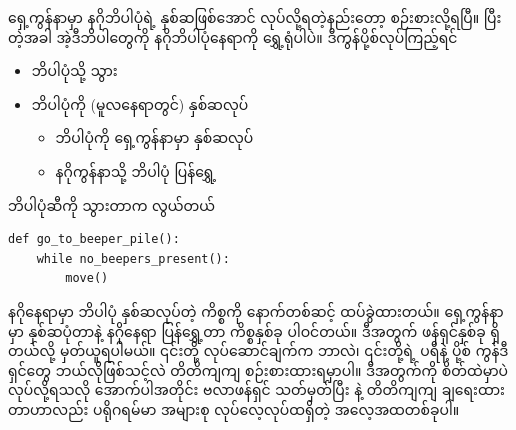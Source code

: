 ရှေ့ကွန်နာမှာ နဂိုဘိပါပုံရဲ့ နှစ်ဆဖြစ်အောင် လုပ်လို့ရတဲ့နည်းတော့ စဉ်းစားလို့ရပြီ။ ပြီးတဲ့အခါ အဲ့ဒီဘိပါတွေကို နဂိုဘိပါပုံနေရာကို ရွှေ့ရုံပါပဲ။ ဒီကွန်ပို့စ်လုပ်ကြည့်ရင် 
%
\begin{itemize}
    \item ဘိပါပုံသို့ သွား       
    \item ဘိပါပုံကို (မူလနေရာတွင်) နှစ်ဆလုပ်    
    \begin{itemize}
        \item ဘိပါပုံကို ရှေ့ကွန်နာမှာ နှစ်ဆလုပ်
        \item နဂိုကွန်နာသို့ ဘိပါပုံ ပြန်ရွှေ့
    \end{itemize}
\end{itemize}
%
ဘိပါပုံဆီကို သွားတာက လွယ်တယ်
%
\setlength{\fboxsep}{0pt}
\begin{verbatim}
def go_to_beeper_pile():
    while no_beepers_present():
        move()
\end{verbatim}
%

 နဂိုနေရာမှာ ဘိပါပုံ နှစ်ဆလုပ်တဲ့ ကိစ္စကို နောက်တစ်ဆင့် ထပ်ခွဲထားတယ်။ ရှေ့ကွန်နာမှာ နှစ်ဆပုံတာနဲ့ နဂိုနေရာ ပြန်ရွှေ့တာ ကိစ္စနှစ်ခု ပါဝင်တယ်။ ဒီအတွက် ဖန်ရှင်နှစ်ခု ရှိတယ်လို့ မှတ်ယူရပါမယ်။ ၎င်းတို့ လုပ်ဆောင်ချက်က ဘာလဲ၊ ၎င်းတို့ရဲ့ ပရီနဲ့ ပို့စ် ကွန်ဒီရှင်တွေ ဘယ်လိုဖြစ်သင့်လဲ တိတိကျကျ စဉ်းစားထားရမှာပါ။ ဒီအတွက်ကို စိတ်ထဲမှာပဲ လုပ်လို့ရသလို အောက်ပါအတိုင်း ဗလာဖန်ရှင်  သတ်မှတ်ပြီး  နဲ့ တိတိကျကျ ချရေးထားတာဟာလည်း ပရိုဂရမ်မာ အများစု လုပ်လေ့လုပ်ထရှိတဲ့ အလေ့အထတစ်ခုပါ။
 

